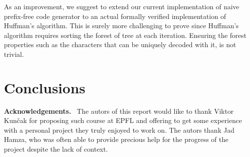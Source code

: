 \documentclass[a4paper,UKenglish,cleveref, autoref, thm-restate]{lipics-v2021}
\begin{document}
As an improvement, we suggest to extend our current implementation of naive prefix-free code generator to an actual formally verified implementation of Huffman's algorithm. This is surely more challenging to prove since Huffman's algorithm requires sorting the forest of tree at each iteration. Ensuring the forest properties such as the characters that can be uniquely decoded with it, is not trivial.

\section{Conclusions}


\vspace{0.5cm} %
\noindent %
\textbf{\large Acknowledgements.}\ %
The autors of this report would like to thank Viktor Kun\v{c}ak for proposing such course at EPFL and offering to get some experience with a personal project they truly enjoyed to work on. The autors thank Jad Hamza, who was often able to provide precious help for the progress of the project despite the lack of context.


\end{document}
